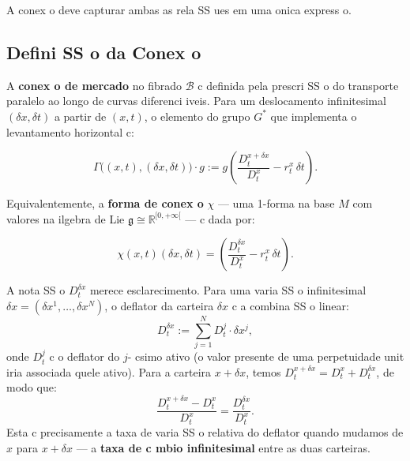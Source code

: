 {A conex o deve capturar ambas as rela SS ues em uma onica express o.

\subsection{Defini SS o da Conex o}

\begin{defi}\label{def:market_connection}
A \textbf{conex o de mercado} no fibrado $\mathcal{B}$ c definida pela
prescri SS o do transporte paralelo ao longo de curvas diferenci iveis.
Para um deslocamento infinitesimal $(\delta x, \delta t)$ a partir de
$(x,t)$, o elemento do grupo $G^*$ que implementa o levantamento
horizontal c:

\begin{equation}\label{eq:connection_definition}
 \Gamma\big((x,t),(\delta x, \delta t)\big) \cdot g
 := g\left(\frac{D_t^{x+\delta x}}{D_t^x} - r_t^x\,\delta t\right).
\end{equation}

Equivalentemente, a \textbf{forma de conex o} $\chi$ --- uma 1-forma
na base $M$ com valores na ilgebra de Lie $\mathfrak{g} \cong
\mathbb{R}^{[0,+\infty[}$ --- c dada por:

\begin{equation}\label{eq:connection_form}
 \chi(x,t)(\delta x, \delta t)
 = \left(\frac{D_t^{\delta x}}{D_t^x} - r_t^x\,\delta t\right).
\end{equation}
\end{defi}

\begin{obs}
A nota SS o $D_t^{\delta x}$ merece esclarecimento. Para uma varia SS o
infinitesimal $\delta x = (\delta x^1, \dots, \delta x^N)$, o deflator
da carteira $\delta x$ c a combina SS o linear:
\begin{equation}\label{eq:D_delta_x}
 D_t^{\delta x} := \sum_{j=1}^N D_t^j \cdot \delta x^j,
\end{equation}
onde $D_t^j$ c o deflator do $j$- csimo ativo (o valor presente de uma
perpetuidade unit iria associada quele ativo). Para a carteira
$x + \delta x$, temos $D_t^{x+\delta x} = D_t^x + D_t^{\delta x}$, de
modo que:
\[
\frac{D_t^{x+\delta x} - D_t^x}{D_t^x}
= \frac{D_t^{\delta x}}{D_t^x}.
\]
Esta c precisamente a taxa de varia SS o relativa do deflator quando
mudamos de $x$ para $x + \delta x$ --- a \textbf{taxa de c mbio
infinitesimal} entre as duas carteiras.
\end{obs}

}
